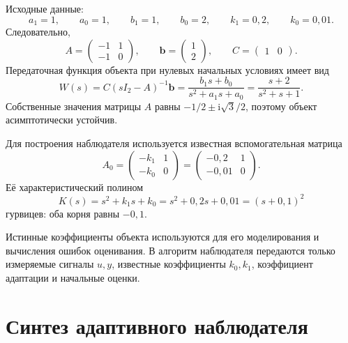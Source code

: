 Исходные данные:
\begin{equation}
  a_1=1,\qquad a_0=1,\qquad b_1=1,\qquad b_0=2,
  \qquad k_1=0{,}2,\qquad k_0=0{,}01.
  \label{eq:variant}
\end{equation}
Следовательно,
\begin{equation}
  A=\begin{pmatrix}-1&1\\-1&0\end{pmatrix},
  \qquad
  \bm b=\begin{pmatrix}1\\2\end{pmatrix},
  \qquad C=\begin{pmatrix}1&0\end{pmatrix}.
\end{equation}
Передаточная функция объекта при нулевых начальных условиях имеет вид
\begin{equation}
  W(s)=C(sI_2-A)^{-1}\bm b
  =\frac{b_1s+b_0}{s^2+a_1s+a_0}
  =\frac{s+2}{s^2+s+1}.
\end{equation}
Собственные значения матрицы $A$ равны
$-1/2\pm \mathrm{i}\sqrt{3}/2$, поэтому объект асимптотически устойчив.

Для построения наблюдателя используется известная вспомогательная матрица
\begin{equation}
  A_0=\begin{pmatrix}-k_1&1\\-k_0&0\end{pmatrix}
  =\begin{pmatrix}-0{,}2&1\\-0{,}01&0\end{pmatrix}.
  \label{eq:filter-matrix}
\end{equation}
Её характеристический полином
\begin{equation}
  K(s)=s^2+k_1s+k_0=s^2+0{,}2s+0{,}01=(s+0{,}1)^2
  \label{eq:filter-polynomial}
\end{equation}
гурвицев: оба корня равны $-0{,}1$.

Истинные коэффициенты объекта используются для его моделирования
и вычисления ошибок оценивания. В алгоритм наблюдателя передаются
только измеряемые сигналы $u,y$, известные коэффициенты $k_0,k_1$,
коэффициент адаптации и начальные оценки.

\section{Синтез адаптивного наблюдателя}

